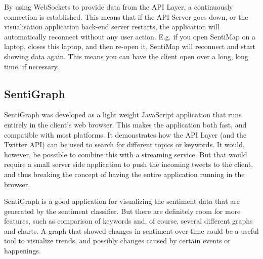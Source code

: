 By using WebSockets to provide data from the API Layer, a continuously connection is established. This means that if the API Server goes down, or the visualisation application back-end server restarts, the application will automatically reconnect without any user action. E.g. if you open SentiMap on a laptop, closes this laptop, and then re-open it, SentiMap will reconnect and start showing data again. This means you can have the client open over a long, long time, if necessary.   

\subsection{SentiGraph}
SentiGraph was developed as a light weight JavaScript application that runs entirely in the client's web browser. This makes the application both fast, and compatible with most platforms. It demonstrates how the API Layer (and the Twitter API) can be used to search for different topics or keywords. It would, however, be possible to combine this with a streaming service. But that would require a small server side application to push the incoming tweets to the client, and thus breaking the concept of having the entire application running in the browser.

SentiGraph is a good application for visualizing the sentiment data that are generated by the sentiment classifier. But there are definitely room for more features, such as comparison of keywords and, of course, several different graphs and charts. A graph that showed changes in sentiment over time could be a useful tool to visualize trends, and possibly changes caused by certain events or happenings. 



